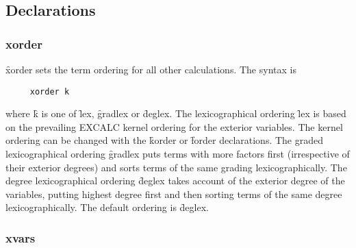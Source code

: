 


\subsection{Declarations}


\subsubsection*{xorder}

\hypertarget{command:XORDER}{}
\f{xorder}
 sets the term ordering for all other calculations. The syntax is
\begin{verbatim}
     xorder k
\end{verbatim}
where \f{k} is one of \f{lex}, \f{gradlex} or \f{deglex}. The
lexicographical ordering \f{lex} is based on the prevailing EXCALC kernel
ordering for the exterior variables. The  kernel ordering can be
changed with the \REDUCE{} \f{korder} or  \f{forder} declarations. The
graded lexicographical ordering \f{gradlex} puts terms with more factors
first (irrespective of their exterior degrees) and sorts terms of the same
grading lexicographically. The degree lexicographical ordering \f{deglex}
takes account of the exterior degree of the variables, putting highest
degree first and then sorting terms of the same degree lexicographically.
The default ordering is \f{deglex}.


\subsubsection*{xvars}

